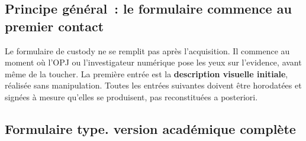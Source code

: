 \subsection{Principe général~: le formulaire commence au premier contact}

Le formulaire de custody ne se remplit pas après l'acquisition. Il commence
au moment où l'OPJ ou l'investigateur numérique pose les yeux sur l'evidence, avant même de la toucher.
La première entrée est la \textbf{description visuelle initiale}, réalisée
sans manipulation. Toutes les entrées suivantes doivent être horodatées et
signées à mesure qu'elles se produisent, pas reconstituées a posteriori.

\subsection{Formulaire type. version académique complète}

